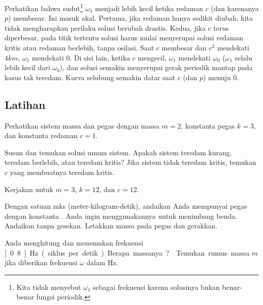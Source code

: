 Perhatikan bahwa \emph{} sudut\footnote{Kita tidak menyebut $\omega_1$ sebagai frekuensi karena solusinya bukan benar-benar fungsi periodik.} $\omega_1$ menjadi lebih kecil ketika redaman $c$ (dan karenanya $p$) membesar. Ini masuk akal. Pertama, jika redaman hanya sedikit diubah, kita tidak mengharapkan perilaku solusi berubah drastis. Kedua, jika $c$ terus diperbesar, pada titik tertentu solusi harus mulai menyerupai solusi redaman kritis atau redaman berlebih, tanpa osilasi. Saat $c$ membesar dan $c^2$ mendekati $4km$, $\omega_1$ mendekati $0$.
%
Di sisi lain, ketika $c$ mengecil, $\omega_1$ mendekati $\omega_0$ ($\omega_1$ selalu lebih kecil dari $\omega_0$), dan solusi semakin menyerupai gerak periodik mantap pada kasus tak teredam. Kurva selubung semakin datar saat $c$ (dan $p$) menuju $0$.

\subsection{Latihan}

\begin{samepage}
\begin{exercise} \label{mv:ex1}
Perhatikan sistem massa dan pegas dengan massa $m=2$, konstanta pegas $k=3$, dan konstanta redaman $c=1$.
\begin{tasks}
\task Susun dan temukan solusi umum sistem.
\task Apakah sistem teredam kurang, teredam berlebih, atau teredam kritis?
\task Jika sistem tidak teredam kritis, temukan $c$ yang membuatnya teredam kritis.
\end{tasks}
\end{exercise}
\end{samepage}

\begin{exercise}
Kerjakan  untuk $m=3$, $k=12$, dan $c=12$.
\end{exercise}

\begin{exercise} \label{mv:exwt1}
Dengan satuan mks (meter-kilogram-detik), andaikan Anda mempunyai pegas dengan konstanta . Anda ingin menggunakannya untuk menimbang benda. Andaikan tanpa gesekan. Letakkan massa pada pegas dan gerakkan.
\begin{tasks}
\task Anda menghitung dan menemukan frekuensi \unit[0.8]{Hz} (siklus per detik). Berapa massanya?
\task Temukan rumus massa $m$ jika diberikan frekuensi $\omega$ dalam \unit{Hz}.
\end{tasks}
\end{exercise}

